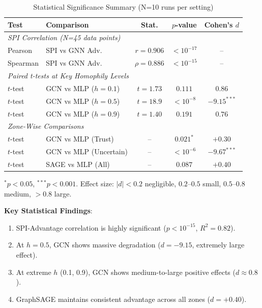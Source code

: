 \begin{table}[t]
\centering
\caption{Statistical Significance Summary (N=10 runs per setting)}
\label{tab:statistical_tests}
\begin{tabular}{@{}llccc@{}}
\toprule
\textbf{Test} & \textbf{Comparison} & \textbf{Stat.} & \textbf{$p$-value} & \textbf{Cohen's $d$} \\
\midrule
\multicolumn{5}{l}{\textit{SPI Correlation (N=45 data points)}} \\
Pearson & SPI vs GNN Adv. & $r = 0.906$ & $< 10^{-17}$ & -- \\
Spearman & SPI vs GNN Adv. & $\rho = 0.886$ & $< 10^{-15}$ & -- \\
\midrule
\multicolumn{5}{l}{\textit{Paired t-tests at Key Homophily Levels}} \\
$t$-test & GCN vs MLP ($h=0.1$) & $t = 1.73$ & $0.111$ & $0.86$ \\
$t$-test & GCN vs MLP ($h=0.5$) & $t = 18.9$ & $< 10^{-8}$ & $-9.15^{***}$ \\
$t$-test & GCN vs MLP ($h=0.9$) & $t = 1.40$ & $0.191$ & $0.76$ \\
\midrule
\multicolumn{5}{l}{\textit{Zone-Wise Comparisons}} \\
$t$-test & GCN vs MLP (Trust) & -- & $0.021^*$ & $+0.30$ \\
$t$-test & GCN vs MLP (Uncertain) & -- & $< 10^{-6}$ & $-9.67^{***}$ \\
$t$-test & SAGE vs MLP (All) & -- & $0.087$ & $+0.40$ \\
\bottomrule
\end{tabular}
\vspace{1mm}
\raggedright\small $^*p < 0.05$, $^{***}p < 0.001$. Effect size: $|d| < 0.2$ negligible, $0.2$--$0.5$ small, $0.5$--$0.8$ medium, $> 0.8$ large.
\end{table}

\textbf{Key Statistical Findings}:
\begin{enumerate}
    \item SPI-Advantage correlation is highly significant ($p < 10^{-15}$, $R^2 = 0.82$).
    \item At $h = 0.5$, GCN shows massive degradation ($d = -9.15$, extremely large effect).
    \item At extreme $h$ (0.1, 0.9), GCN shows medium-to-large positive effects ($d \approx 0.8$).
    \item GraphSAGE maintains consistent advantage across all zones ($d = +0.40$).
\end{enumerate}

